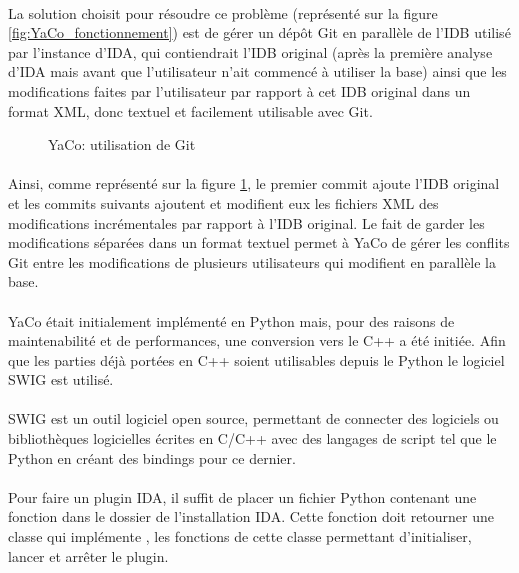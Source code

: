 \documentclass[11pt, book, english, french, standardlists]{upmethodology-document}
\begin{document}
				\paragraph*{}
					La solution choisit pour résoudre ce problème (représenté sur la figure \ref{fig:YaCo_fonctionnement}) est de gérer un dépôt Git en parallèle de l'\gls{IDB} utilisé par l'instance d'IDA, qui contiendrait l'\gls{IDB} original (après la première analyse d'IDA mais avant que l'utilisateur n'ait commencé à utiliser la base) ainsi que les modifications faites par l'utilisateur par rapport à cet \gls{IDB} original dans un format \gls{XML}, donc textuel et facilement utilisable avec Git.
				\begin{figure}[H]
					\centering
					\caption{YaCo: utilisation de Git}
					\label{fig:YaCo_git_usage}
				\end{figure}
				\paragraph*{}
					Ainsi, comme représenté sur la figure \ref{fig:YaCo_git_usage}, le premier commit ajoute l'\gls{IDB} original et les commits suivants ajoutent et modifient eux les fichiers \gls{XML} des modifications incrémentales par rapport à l'\gls{IDB} original. Le fait de garder les modifications séparées dans un format textuel permet à YaCo de gérer les conflits Git entre les modifications de plusieurs utilisateurs qui modifient en parallèle la base.
				\paragraph*{}
					YaCo était initialement implémenté en Python mais, pour des raisons de maintenabilité et de performances, une conversion vers le C++ a été initiée. Afin que les parties déjà portées en C++ soient utilisables depuis le Python le logiciel \gls{SWIG} est utilisé.
				\paragraph*{}
					\gls{SWIG} est un outil logiciel open source, permettant de connecter des logiciels ou bibliothèques logicielles écrites en C/C++ avec des langages de script tel que le Python en créant des bindings pour ce dernier.
				\paragraph*{}
					Pour faire un plugin IDA, il suffit de placer un fichier Python contenant une fonction  dans le dossier  de l'installation IDA. Cette fonction doit retourner une classe qui implémente , les fonctions de cette classe permettant d'initialiser, lancer et arrêter le plugin.
\end{document}
